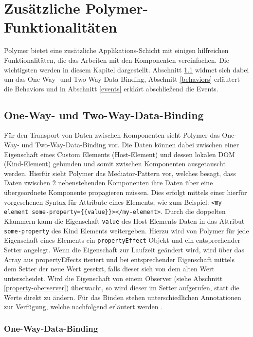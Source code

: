 \chapter{Zusätzliche Polymer-Funktionalitäten}\label{zusaetzliche-polymer-funktionalitaeten}

Polymer bietet eine zusätzliche Applikations-Schicht mit einigen hilfreichen Funktionalitäten, die das Arbeiten mit den Komponenten vereinfachen. Die wichtigsten werden in diesem Kapitel dargestellt. Abschnitt \ref{one-way--und-two-way-data-binding} widmet sich dabei um das One-Way- und Two-Way-Data-Binding, Abschnitt \ref{behaviors} erläutert die Behaviors und in Abschnitt \ref{events} erklärt abschließend die Events.


\section{One-Way- und Two-Way-Data-Binding}\label{one-way--und-two-way-data-binding}

Für den Transport von Daten zwischen Komponenten sieht Polymer das One-Way- und Two-Way-Data-Binding vor. Die Daten können dabei zwischen einer Eigenschaft eines Custom Elements (Host-Element) und dessen lokalen \ac{DOM} (Kind-Element) gebunden und somit zwischen Komponenten ausgetauscht werden. Hierfür sieht Polymer das Mediator-Pattern vor, welches besagt, dass Daten zwischen 2 nebenstehenden Komponenten ihre Daten über eine übergeordnete Komponente propagieren müssen. Dies erfolgt mittels einer hierfür vorgesehenen Syntax für Attribute eines Elements, wie zum Beispiel: \texttt{\textless{}my-element\ some-property=\{\{value\}\}\textgreater{}\textless{}/my-element\textgreater{}}. Durch die doppelten Klammern kann die Eigenschaft \texttt{value} des Host Elements Daten in das Attribut \texttt{some-property} des Kind Elements weitergeben. Hierzu wird von Polymer für jede Eigenschaft eines Elements ein \texttt{propertyEffect} Objekt und ein entsprechender Setter angelegt. Wenn die Eigenschaft zur Laufzeit geändert wird, wird über das Array aus propertyEffects iteriert und bei entsprechender Eigenschaft mittels dem Setter der neue Wert gesetzt, falls dieser sich von dem alten Wert unterscheidet. Wird die Eigenschaft von einem Observer (siehe Abschnitt \ref{property-oberserver}) überwacht, so wird dieser im Setter aufgerufen, statt die Werte direkt zu ändern. Für das Binden stehen unterschiedlichen Annotationen zur Verfügung, welche nachfolgend erläutert werden \cite{citeulike:13914892}.


\subsection{One-Way-Data-Binding}\label{one-way-data-binding}

